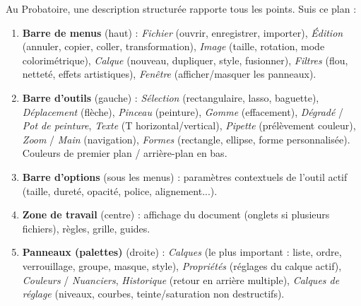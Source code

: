 \documentclass[11pt]{article}
\begin{document}
\begin{methode}
Au Probatoire, une description structurée rapporte tous les points. Suis ce plan :
\begin{enumerate}
  \item \textbf{Barre de menus} (haut) : \emph{Fichier} (ouvrir, enregistrer, importer), \emph{Édition} (annuler, copier, coller, transformation), \emph{Image} (taille, rotation, mode colorimétrique), \emph{Calque} (nouveau, dupliquer, style, fusionner), \emph{Filtres} (flou, netteté, effets artistiques), \emph{Fenêtre} (afficher/masquer les panneaux).
  \item \textbf{Barre d'outils} (gauche) : \emph{Sélection} (rectangulaire, lasso, baguette), \emph{Déplacement} (flèche), \emph{Pinceau} (peinture), \emph{Gomme} (effacement), \emph{Dégradé} / \emph{Pot de peinture}, \emph{Texte} (T horizontal/vertical), \emph{Pipette} (prélèvement couleur), \emph{Zoom} / \emph{Main} (navigation), \emph{Formes} (rectangle, ellipse, forme personnalisée). Couleurs de premier plan / arrière-plan en bas.
  \item \textbf{Barre d'options} (sous les menus) : paramètres contextuels de l'outil actif (taille, dureté, opacité, police, alignement...).
  \item \textbf{Zone de travail} (centre) : affichage du document (onglets si plusieurs fichiers), règles, grille, guides.
  \item \textbf{Panneaux (palettes)} (droite) : \emph{Calques} (le plus important : liste, ordre, verrouillage, groupe, masque, style), \emph{Propriétés} (réglages du calque actif), \emph{Couleurs} / \emph{Nuanciers}, \emph{Historique} (retour en arrière multiple), \emph{Calques de réglage} (niveaux, courbes, teinte/saturation non destructifs).
\end{enumerate}
\end{methode}
\end{document}
